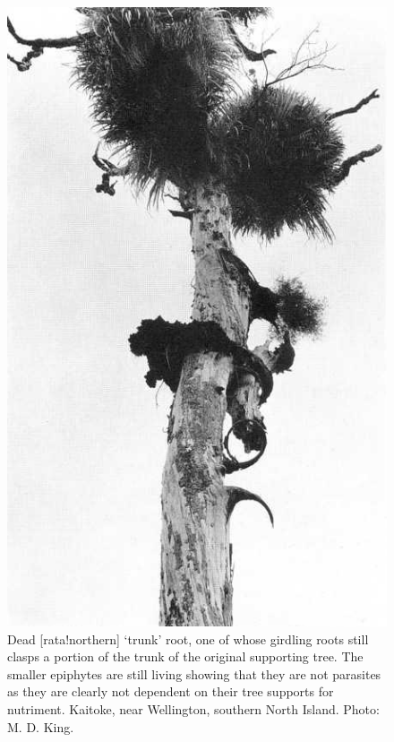 \begin{figure}[!htb]
\begin{minipage}[t]{0.455\textwidth}
    	\includegraphics[width=\textwidth]{graphics/figure53dead-rata.jpg}
    	\caption[Dead northern rata `trunk' root]{Dead [rata!northern] `trunk' root, one of whose girdling roots still clasps a portion of the trunk of the original supporting tree.
    	The smaller epiphytes are still living showing that they are not parasites as they are clearly not dependent on their tree supports for nutriment.
    	Kaitoke, near Wellington, southern North Island.
    	Photo: M. D. King.}%
    	\label{fig:53dead-rata}
	\end{minipage}
\end{figure}

